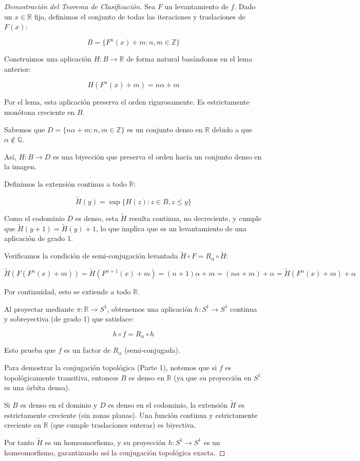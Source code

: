 \begin{proof}[Demostración del Teorema de Clasificación]
	
	Sea $F$ un levantamiento de $f$. Dado un $x \in \mathbb{R}$ fijo, definimos el conjunto de todas las iteraciones y traslaciones de $F(x)$:
	
	$$ B = \{F^n(x) + m : n, m \in \mathbb{Z}\} $$
	
	Construimos una aplicación $H: B \to \mathbb{R}$ de forma natural basándonos en el lema anterior:
	
	$$ H(F^n(x) + m) = n\alpha + m $$
	
	Por el lema, esta aplicación preserva el orden rigurosamente. Es estrictamente monótona creciente en $B$.
	
	Sabemos que $D = \{n\alpha + m : n, m \in \mathbb{Z}\}$ es un conjunto denso en $\mathbb{R}$ debido a que $\alpha \notin \mathbb{Q}$.
	
	Así, $H: B \to D$ es una biyección que preserva el orden hacia un conjunto denso en la imagen.
	
	
	Definimos la extensión continua a todo $\mathbb{R}$:
	
	$$ \tilde{H}(y) = \sup \{H(z) : z \in B, z \le y\} $$
	
	Como el codominio $D$ es denso, esta $\tilde{H}$ resulta continua, no decreciente, y cumple que $\tilde{H}(y+1) = \tilde{H}(y) + 1$, lo que implica que es un levantamiento de una aplicación de grado 1.
	
	
	Verificamos la condición de semi-conjugación levantada $\tilde{H} \circ F = R_\alpha \circ \tilde{H}$:
	
	$$ \tilde{H}(F(F^n(x) + m)) = \tilde{H}(F^{n+1}(x) + m) = (n+1)\alpha + m = (n\alpha + m) + \alpha = \tilde{H}(F^n(x) + m) + \alpha $$
	
	Por continuidad, esto se extiende a todo $\mathbb{R}$.
	
	Al proyectar mediante $\pi: \mathbb{R} \to S^1$, obtenemos una aplicación $h: S^1 \to S^1$ continua y sobreyectiva (de grado 1) que satisface:
	
	$$ h \circ f = R_\alpha \circ h $$
	
	Esto prueba que $f$ es un factor de $R_\alpha$ (semi-conjugada).
	
	
	Para demostrar la conjugación topológica (Parte 1), notemos que si $f$ es topológicamente transitiva, entonces $B$ es denso en $\mathbb{R}$ (ya que su proyección en $S^1$ es una órbita densa). 
	
	Si $B$ es denso en el dominio y $D$ es denso en el codominio, la extensión $\tilde{H}$ es estrictamente creciente (sin zonas planas). Una función continua y estrictamente creciente en $\mathbb{R}$ (que cumple traslaciones enteras) es biyectiva. 
	
	Por tanto $\tilde{H}$ es un homeomorfismo, y su proyección $h: S^1 \to S^1$ es un homeomorfismo, garantizando así la conjugación topológica exacta.
	
\end{proof}


